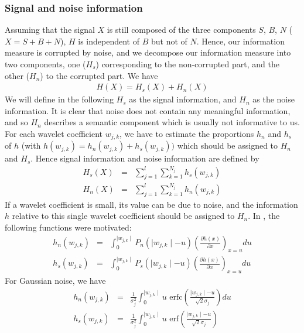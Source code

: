 \documentclass[11pt,a4paper]{article}
\begin{document}
\subsubsection{Signal and noise information}
Assuming that the signal $X$ is still composed of the three components 
$S$, $B$, $N$ ($X = S + B + N$), $H$ is independent of $B$ but not of $N$.
Hence, our information measure
is corrupted by noise, and we decompose our information measure
into two components, one ($H_s$) corresponding to the non-corrupted part, and
the other ($H_n$) to the corrupted part. We have \cite{starck:sta98_2}
\begin{eqnarray}
H(X) = H_s(X) + H_n(X)
\end{eqnarray}
We will define in the following $H_s$ as the signal information, and $H_n$
as the noise information. It is clear that noise does not 
contain any meaningful information, and so $H_n$ describes a semantic 
component which is usually not informative to us.
For each wavelet coefficient $w_{j,k}$, we have to estimate the 
proportions
$h_n$ and $h_s$ of $h$ (with $h(w_{j,k}) = h_n(w_{j,k}) + h_s(w_{j,k}))$
which should be assigned to $H_n$ and $H_s$.
Hence  signal information and  noise information are defined by
\begin{eqnarray}
H_s(X) & = & \sum_{j=1}^{l} \sum_{k=1}^{N_j} h_s(w_{j,k})    \nonumber \\  
H_n(X) & = & \sum_{j=1}^{l} \sum_{k=1}^{N_j} h_n(w_{j,k})     
\label{eq_entrop_result_2}
\end{eqnarray}
If a wavelet coefficient is small, its value can be due to noise, 
and the information $h$ relative to this single wavelet coefficient
should be assigned to $H_n$.
In \cite{starck:sta01_1}, the following functions were motivated:
\begin{eqnarray}
h_n(w_{j,k}) & = &  \int_{0}^{\mid w_{j,k} \mid } P_n(\mid w_{j,k} \mid - u) 
\left(\frac{\partial h(x)}{\partial x}\right)_{x=u} du \\
 h_s(w_{j,k}) & = &  \int_{0}^{\mid w_{j,k} \mid } P_s(\mid w_{j,k} \mid - u) 
\left(\frac{\partial h(x)}{\partial x}\right)_{x=u} du
\end{eqnarray}
For Gaussian noise, we have
\begin{eqnarray}
h_n(w_{j,k}) & = &  \frac{1}{\sigma_j^2} \int_{0}^{\mid w_{j,k} \mid} u 
\mbox{ erfc}
\left(\frac{\mid w_{j,k} \mid -u}{\sqrt{2} \sigma_j}\right) du \nonumber \\
h_s(w_{j,k}) & = &  \frac{1}{\sigma_j^2} \int_{0}^{\mid w_{j,k} \mid} u 
\mbox{ erf}\left(\frac{\mid w_{j,k} \mid -u}{\sqrt{2} \sigma_j}\right)
\label{eqn_hn2}
\end{eqnarray}
\end{document}
